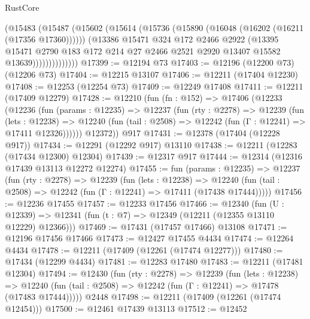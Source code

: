 \begin{lexlean}{RustCore}
\begin{coremodule}
                    (@15483
                      (@15487
                        (@15602
                          (@15614
                            (@15736 (@15890 (@16048 (@16202 (@16211 (@17356 @17360))))))
                            (@13386
                              @15471
                              @324
                              @172
                              @2466
                              @2922
                              (@13395
                                @15471
                                @2790
                                @183
                                @172
                                @214
                                @27
                                @2466
                                @2521
                                @2920
                                @13407
                                @15582
                                @13639))))))))))))))
@17399 := @12194 @73
@17403 := @12196 (@12200 @73) (@12206 @73)
@17404 := @12215 @13107
@17406 := @12211 (@17404 @12230)
@17408 := @12253 (@12254 @73)
@17409 := @12249 @17408
@17411 := @12211 (@17409 @12279)
@17428 := @12210
    (fun (fn : @152) =>
    @17406
      (@12233
        (@12236
          (fun (params : @12235) =>
          @12237
            (fun (rty : @2278) =>
            @12239
              (fun (lets : @12238) =>
              @12240 (fun (tail : @2508) => @12242 (fun (Γ : @12241) => @17411 @12326))))))
        @12372))
    @917
@17431 := @12378 (@17404 (@12228 @917))
@17434 := @12291 (@12292 @917) @13110
@17438 := @12211 (@12283 (@17434 @12300) @12304)
@17439 := @12317 @917
@17444 := @12314 (@12316 @17439 @13113 @12272 @12274)
@17455 := fun (params : @12235) =>
  @12237
    (fun (rty : @2278) =>
    @12239
      (fun (lets : @12238) =>
      @12240 (fun (tail : @2508) => @12242 (fun (Γ : @12241) => @17411 (@17438 @17444)))))
@17456 := @12236 @17455
@17457 := @12233 @17456
@17466 := @12340
    (fun (U : @12339) => @12341 (fun (t : @7) => @12349 (@12211 (@12355 @13110 @12229) @12366)))
@17469 := @17431 (@17457 @17466) @13108
@17471 := @12196 @17456 @17466
@17473 := @12427 @17455 @4434
@17474 := @12264 @4434
@17478 := @12211 (@17409 (@12261 (@17474 @12277)))
@17480 := @17434 (@12299 @4434)
@17481 := @12283 @17480
@17483 := @12211 (@17481 @12304)
@17494 := @12430
    (fun (rty : @2278) =>
    @12239
      (fun (lets : @12238) =>
      @12240 (fun (tail : @2508) => @12242 (fun (Γ : @12241) => @17478 (@17483 @17444)))))
    @2448
@17498 := @12211 (@17409 (@12261 (@17474 @12454)))
@17500 := @12461 @17439 @13113
@17512 := @12452

\end{coremodule}
\end{lexlean}
